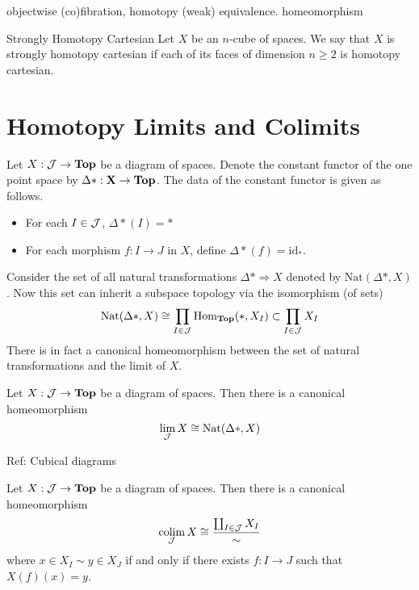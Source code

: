 \documentclass[a4paper]{article}
\begin{document}
objectwise (co)fibration, homotopy (weak) equivalence. homeomorphism

\begin{defn}{Strongly Homotopy Cartesian}{} Let $X$ be an $n$-cube of spaces. We say that $X$ is strongly homotopy cartesian if each of its faces of dimension $n\geq 2$ is homotopy cartesian. 
\end{defn}

\pagebreak
\section{Homotopy Limits and Colimits}

Let $X:\mathcal{J}\to\bold{Top}$ be a diagram of spaces. Denote the constant functor of the one point space by $\Delta\ast:\bold{X}\to\bold{Top}$. The data of the constant functor is given as follows. 
\begin{itemize}
\item For each $I\in\mathcal{J}$, $\Delta\ast(I)=\ast$
\item For each morphism $f:I\to J$ in $X$, define $\Delta\ast(f)=\text{id}_\ast$. 
\end{itemize}
Consider the set of all natural transformations $\Delta\ast\Rightarrow X$ denoted by $\text{Nat}(\Delta\ast,X)$. Now this set can inherit a subspace topology via the isomorphism (of sets) $$\text{Nat}(\Delta\ast,X)\cong\prod_{I\in\mathcal{J}}\operatorname{Hom}_\bold{Top}(\ast,X_I)\subset\prod_{I\in\mathcal{J}}X_I$$ There is in fact a canonical homeomorphism between the set of natural transformations and the limit of $X$. 

\begin{thm}{}{} Let $X:\mathcal{J}\to\bold{Top}$ be a diagram of spaces. Then there is a canonical homeomorphism $$\lim_{\mathcal{J}} X\cong\text{Nat}(\Delta\ast,X)$$
\end{thm}
Ref: Cubical diagrams

\begin{thm}{}{} Let $X:\mathcal{J}\to\bold{Top}$ be a diagram of spaces. Then there is a canonical homeomorphism $$\operatorname*{colim}_{\mathcal{J}} X\cong\frac{\coprod_{I\in\mathcal{J}}X_I}{\sim}$$ where $x\in X_I\sim y\in X_J$ if and only if there exists $f:I\to J$ such that $X(f)(x)=y$. 
\end{thm}
\end{document}
